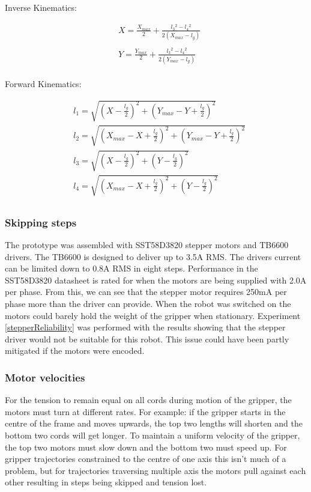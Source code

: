 \documentclass[conference]{IEEEtran}
\begin{document}
Inverse Kinematics:

\begin{equation}
\begin{aligned}
&X = \frac{X_{max}}{2} + \frac{l_3{}^2 - l_4{}^2}{2\left(X_{max} - l_g\right)}\\ \\
&Y = \frac{Y_{max}}{2} + \frac{l_3{}^2 - l_4{}^2}{2\left(Y_{max} - l_g\right)}\\
\end{aligned}
\end{equation}

Forward Kinematics:

\begin{equation}
\begin{aligned}
&l_1 = \sqrt{\left(X - \frac{l_g}{2}\right)^2 + \left(Y_{max}-Y+\frac{l_g}{2}\right)^2}\\
&l_2 = \sqrt{\left(X_{max}-X+\frac{l_g}{2}\right)^2 + \left(Y_{max}-Y+\frac{l_g}{2}\right)^2}\\
&l_3 = \sqrt{\left(X-\frac{l_g}{2}\right)^2 + \left(Y-\frac{l_g}{2}\right)^2}\\
&l_4 = \sqrt{\left(X_{max}-X+\frac{l_g}{2}\right)^2 + \left(Y-\frac{l_g}{2}\right)^2}\\
\end{aligned}
\end{equation}

\subsubsection{Skipping steps}\label{motor_issues}
The prototype was assembled with SST58D3820 stepper motors and TB6600 drivers. The TB6600 is designed to deliver up to 3.5A RMS. The drivers current can be limited down to 0.8A RMS in eight steps. Performance in the SST58D3820 datasheet is rated for when the motors are being supplied with 2.0A per phase. From this, we can see that the stepper motor requires 250mA per phase more than the driver can provide. When the robot was switched on the motors could barely hold the weight of the gripper when stationary. Experiment \ref{stepperReliability} was performed with the results showing that the stepper driver would not be suitable for this robot. This issue could have been partly mitigated if the motors were encoded.

\subsubsection{Motor velocities}\label{motor_vel_problem}
For the tension to remain equal on all cords during motion of the gripper, the motors must turn at different rates. For example: if the gripper starts in the centre of the frame and moves upwards, the top two lengths will shorten and the bottom two cords will get longer. To maintain a uniform velocity of the gripper, the top two motors must slow down and the bottom two must speed up. For gripper trajectories constrained to the centre of one axis this isn't much of a problem, but for trajectories traversing multiple axis the motors pull against each other resulting in steps being skipped and tension lost.
\end{document}
